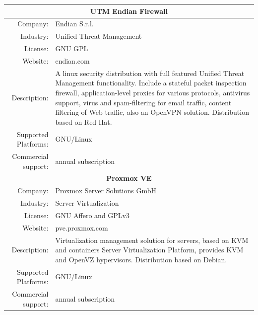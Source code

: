 \documentclass[a4paper, 12pt]{book}
\begin{document}
\begin{table}
  \centering
  \begin{tabular}{ | r m{10cm} | }
  
    \hline    
    \multicolumn{2}{|c|}{\textbf{UTM Endian Firewall}}\\
    \hline
    Company: & Endian S.r.l. \\
    Industry: & Unified Threat Management \\
    License: & GNU GPL \\
    Website: & endian.com \\
    Description: & A linux security distribution with full featured Unified Threat Management functionality. Include a stateful packet inspection firewall, application-level proxies for various protocols, antivirus support, virus and spam-filtering for email traffic, content filtering of Web traffic, also an OpenVPN solution. Distribution based on Red Hat. \\
    Supported Platforms: & GNU/Linux \\
    Commercial support: & annual subscription \\
    
    \hline
    \multicolumn{2}{|c|}{\textbf{Proxmox VE}}\\
    \hline
    Company: & Proxmox Server Solutions GmbH \\
    Industry: & Server Virtualization \\
    License: & GNU Affero and GPLv3 \\
    Website: & pve.proxmox.com \\
    Description: & Virtualization management solution for servers, based on KVM and containers Server Virtualization Platform, provides KVM and OpenVZ hypervisors. Distribution based on Debian. \\
    Supported Platforms: & GNU/Linux \\
    Commercial support: & annual subscription \\
    

\end{tabular}
\end{table}
\end{document}
